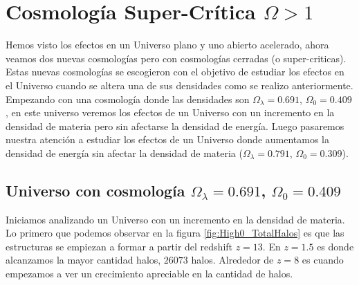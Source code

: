 \section[Cosmología Super-Crítica \texorpdfstring{$\Omega > 1$}{Omega > 1}]{Cosmología Super-Crítica \texorpdfstring{$\Omega > 1$}{Omega > 1}}

\noindent Hemos visto los efectos en un Universo plano y uno abierto acelerado, ahora veamos dos nuevas cosmologías pero con cosmologías cerradas (o super-criticas). Estas nuevas cosmologías se escogieron con el objetivo de estudiar los efectos en el Universo cuando se altera una de sus densidades como se realizo anteriormente. Empezando con una cosmología donde las densidades son $\Omega_\lambda = 0.691$, $\Omega_0 = 0.409$, en este universo veremos los efectos de un Universo con un incremento en la densidad de materia pero sin afectarse la densidad de energía. Luego pasaremos nuestra atención a estudiar los efectos de un Universo donde aumentamos la densidad de energía sin afectar la densidad de materia ($\Omega_\lambda = 0.791$, $\Omega_0 = 0.309$).

\subsection{Universo con cosmología \texorpdfstring{$\Omega_\lambda = 0.691$, $\Omega_0 = 0.409$ }{Omega lambda = 0.691, Omega 0 = 0.409}  }

Iniciamos analizando un Universo con un incremento en la densidad de materia. Lo primero que podemos observar en la figura \ref{fig:High0_TotalHalos} es que las estructuras se empiezan a formar a partir del redshift $z=13$. En $z= 1.5$ es donde alcanzamos la mayor cantidad halos, $26073$ halos. Alrededor de $z = 8$ es cuando empezamos a ver un crecimiento apreciable en la cantidad de halos.

